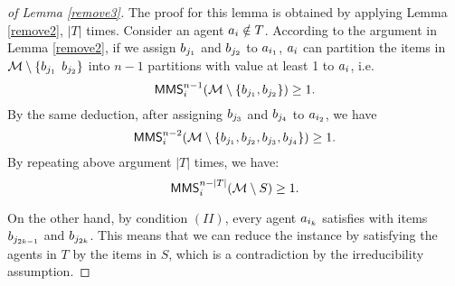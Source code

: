 \begin{proof}[of Lemma \ref{remove3}]
The proof for this lemma is obtained by applying Lemma \ref{remove2}, $|T|$ times. Consider an agent $a_i \notin T$. According to the argument in Lemma \ref{remove2}, if we assign $b_{{j_1}}$ and $b_{{j_2}}$ to $a_{i_1}$, $a_i$ can partition the items in $\mathcal{M} \setminus \{ b_{{j_1}}$ $b_{{j_2}}\}$ into $n-1$ partitions with value at least 1 to $a_i$, i.e.
$$\mathsf{MMS}_{i}^{n-1}(\mathcal{M}\setminus \{b_{j_1},b_{j_2}\}) \geq 1.$$
By the same deduction, after assigning $b_{{j_3}}$ and $b_{{j_4}}$ to $a_{i_2}$, we have
$$\mathsf{MMS}_{i}^{n-2}(\mathcal{M}\setminus \{b_{j_1},b_{j_2},b_{j_3},b_{j_4}\}) \geq 1.$$
By repeating above argument $|T|$ times, we have:
$$\mathsf{MMS}_{i}^{n-|T|}(\mathcal{M}\setminus S) \geq 1.$$

On the other hand, by condition $(II)$, every agent $a_{i_k}$ satisfies with items $b_{j_{2k-1}}$ and $b_{j_{2k}}$. This means that we can reduce the instance by satisfying the agents in $T$ by the items in $S$, which is a contradiction by the irreducibility assumption.


\begin{comment}
We show that if all the conditions are met, the instance is $3/4$-reducible. To show this, let $\mathcal{A}$ be an allocation of $S$ to the agents in $T$ such that all of the conditions are met. Suppose that $\mathcal{A} = \langle A_{i_1}, A_{i_2}, \ldots, A_{i_{|T|}}\rangle$ where $A_{i_a} = \{\ite_{j_{2a-1}},\ite_{j_{2a}}\}$ for every $\agent_{i_a} \in T$. According to  condition (ii), after we allocate the items, every $\agent_{i_a} \in T$ has a value of at least $3/4$ for the items assigned to him. Now, if we prove that for every $\agent_i \notin T$ we have $\MMS_{V_i}^{n-|T|} (\items \setminus S)\geq 1$, our problem will be $3/4$-reducible which contradicts our assumption. \\
Suppose there is at least one agent $\agent_i \notin T$ such that $\MMS_{V_i}^{n-|T|} (\items \setminus S) < 1$. 
Before removing $S$, $\agent_i$ can divide $\items$ into $n$ parts ${\cal P} =\langle P_1, P_2, \ldots, P_n \rangle$ such that $V_i(P_k) \geq 1$ for every $k$. Suppose that $\ite_{j_1}$ and $\ite_{j_2}$ are in parts $P_{k_1}$ and $P_{k_2}$ respectively. As a first step, we start a procedure of removing the items of $S$ with $\ite_{j_1}$ and $\ite_{j_2}$ from $P_{k_1}$ and $P_{k_2}$. If $k_1 = k_2$, after this removal, the other $n-1$ parts will have a value of at least $1$ to $\agent_i$. Also, we add the rest of the items of $P_{k_1}$ to another arbitrary part. 


\end{comment}
\end{proof}
